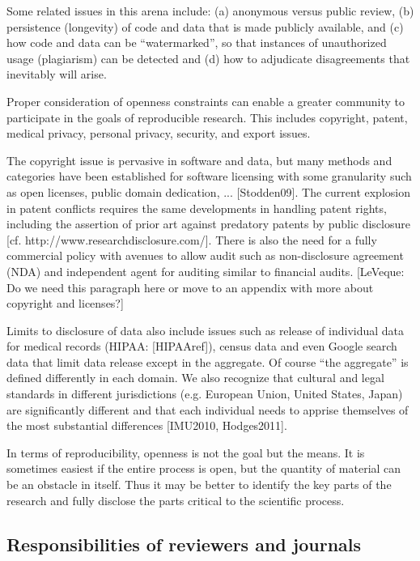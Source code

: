 \documentclass[11pt]{article}
\newcommand{\comment}[1]{{\color{blue} [#1]}}
\newcommand{\comment}[1]{}
\begin{document}
Some related issues in this arena include: (a) anonymous versus public
review, (b) persistence (longevity) of code and data that is made publicly
available, and (c) how code and data can be ``watermarked'', so that instances
of unauthorized usage (plagiarism) can be detected and (d) how to adjudicate
disagreements that inevitably will arise.

Proper consideration of openness constraints can enable a greater community
to participate in the goals of reproducible research. This includes
copyright, patent, medical privacy, personal privacy, security, and export
issues.

The copyright issue is pervasive in software and data, but many methods and
categories have been established for software licensing with some
granularity such as open licenses, public domain dedication, ...
[Stodden09]. The current explosion in patent conflicts requires the same
developments in handling patent rights, including the assertion of prior art
against predatory patents by public disclosure [cf.
http://www.researchdisclosure.com/]. There is also the need for a fully
commercial policy with avenues to allow audit such as non-disclosure
agreement (NDA) and independent agent for auditing similar to financial audits.
\comment{LeVeque: Do we need this paragraph here or move to an appendix with
more about copyright and licenses?}

Limits to disclosure of data also include issues such as release of
individual data for medical records (HIPAA: [HIPAAref]), census data and
even Google search data that
limit data release except in the aggregate. Of course ``the aggregate'' is
defined differently in each domain.
We also recognize that cultural and legal standards in different
jurisdictions (e.g. European Union, United States, Japan) are significantly
different and that each individual needs to apprise themselves of the most
substantial differences [IMU2010, Hodges2011].

In terms of reproducibility, openness is not the goal but the means. It is
sometimes easiest if the entire process is open, but the quantity of
material can be an obstacle in itself. Thus it may be better to identify the key
parts of the research and fully disclose the parts critical to the
scientific process. 

\subsection{Responsibilities of reviewers and journals}
\end{document}
